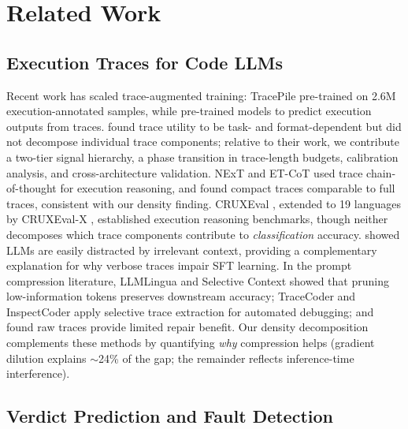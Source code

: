 \section{Related Work}

\subsection{Execution Traces for Code LLMs}

Recent work has scaled trace-augmented training: TracePile \citep{chen2025tracepile} pre-trained on 2.6M execution-annotated samples, while \citet{liu2023codeexecution} pre-trained models to predict execution outputs from traces.
\citet{wang2025dcsh} found trace utility to be task- and format-dependent but did not decompose individual trace components; relative to their work, we contribute a two-tier signal hierarchy, a phase transition in trace-length budgets, calibration analysis, and cross-architecture validation.
NExT \citep{ni2024next} and ET-CoT \citep{eguchi2025etcot} used trace chain-of-thought for execution reasoning, and \citet{ferrando2025execute} found compact traces comparable to full traces, consistent with our density finding.
CRUXEval \citep{gu2024cruxeval}, extended to 19 languages by CRUXEval-X \citep{xu2025cruxevalx}, established execution reasoning benchmarks, though neither decomposes which trace components contribute to \emph{classification} accuracy.
\citet{shi2023distracted} showed LLMs are easily distracted by irrelevant context, providing a complementary explanation for why verbose traces impair SFT learning.
In the prompt compression literature, LLMLingua \citep{jiang2023llmlingua} and Selective Context \citep{li2023selectivecontext} showed that pruning low-information tokens preserves downstream accuracy; TraceCoder \citep{huang2026tracecoder} and InspectCoder \citep{wang2025inspectcoder} apply selective trace extraction for automated debugging; and \citet{haque2025traces} found raw traces provide limited repair benefit.
Our density decomposition complements these methods by quantifying \emph{why} compression helps (gradient dilution explains ${\sim}$24\% of the gap; the remainder reflects inference-time interference).

\subsection{Verdict Prediction and Fault Detection}

